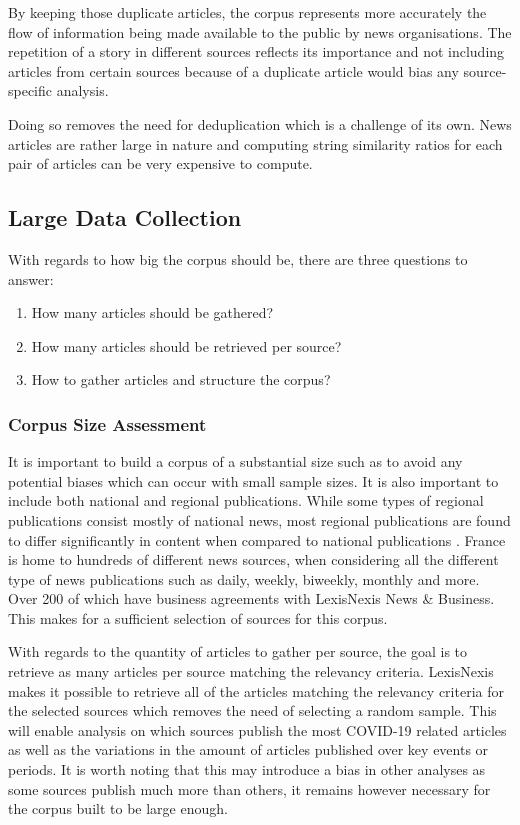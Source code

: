 By keeping those duplicate articles, the corpus represents more accurately the flow of information being made available to the public by news organisations. The repetition of a story in different sources reflects its importance and not including articles from certain sources because of a duplicate article would bias any source-specific analysis.

Doing so removes the need for deduplication which is a challenge of its own. News articles are rather large in nature and computing string similarity ratios for each pair of articles can be very expensive to compute.

\subsection{Large Data Collection}\label{Data Collection}

With regards to how big the corpus should be, there are three questions to answer:
\begin{enumerate}
    \item How many articles should be gathered?
    \item How many articles should be retrieved per source?
    \item How to gather articles and structure the corpus?
\end{enumerate}

\subsubsection{Corpus Size Assessment}

It is important to build a corpus of a substantial size such as to avoid any potential biases which can occur with small sample sizes. It is also important to include both national and regional publications. While some types of regional publications consist mostly of national news, most regional publications are found to differ significantly in content when compared to national publications \cite{ballarini2008presse}. France is home to hundreds of different news sources, when considering all the different type of news publications such as daily, weekly, biweekly, monthly and more. Over 200 of which have business agreements with LexisNexis News \& Business. This makes for a sufficient selection of sources for this corpus.

With regards to the quantity of articles to gather per source, the goal is to retrieve as many articles per source matching the relevancy criteria. LexisNexis makes it possible to retrieve all of the articles matching the relevancy criteria for the selected sources which removes the need of selecting a random sample. This will enable analysis on which sources publish the most COVID-19 related articles as well as the variations in the amount of articles published over key events or periods. It is worth noting that this may introduce a bias in other analyses as some sources publish much more than others, it remains however necessary for the corpus built to be large enough.

